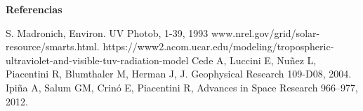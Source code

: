 \documentclass{article}
\begin{document}
\begin{minipage}{0.35\linewidth}
\begin{center}
\begin{shaded}
\textbf{\textcolor{ver}{Referencias}}
\end{shaded}
\end{center}
\changefontsizes{10pt}
\begin{enumerate}
 S. Madronich, Environ. UV Photob, 1-39, 1993
 www.nrel.gov/grid/solar-resource/smarts.html.
 https://www2.acom.ucar.edu/modeling/tropospheric-ultraviolet-and-visible-tuv-radiation-model
 Cede A, Luccini E, Nuñez L, Piacentini R, Blumthaler M, Herman J, J.
Geophysical Research 109-D08, 2004.
 Ipiña A, Salum GM, Crinó E, Piacentini R, Advances in Space
Research 966–977, 2012.
\end{enumerate}
\end{minipage}
\end{document}
